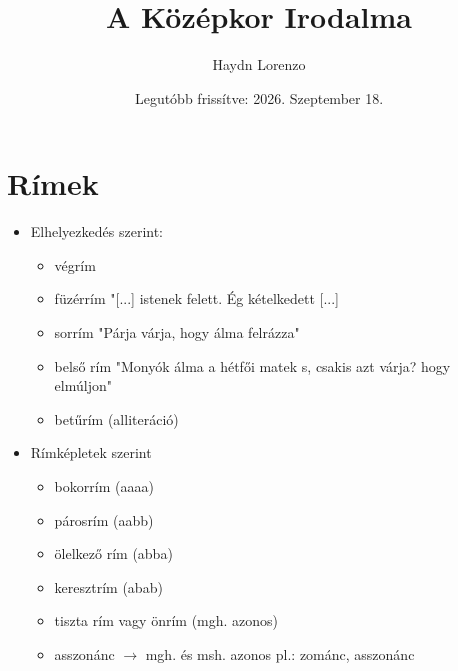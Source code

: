 \documentclass{article}
\title{A Középkor Irodalma}
\author{Haydn Lorenzo}
\date{Legutóbb frissítve: 2026. Szeptember 18.}
\begin{document}
\maketitle
\tableofcontents
\newpage

\section{Rímek}
\begin{itemize}
    \item Elhelyezkedés szerint:
    \begin{itemize}
        \item végrím
        \item füzérrím "[...] istenek felett. Ég kételkedett [...]
        \item sorrím "Párja várja, hogy álma felrázza"
        \item belső rím "Monyók álma a hétfői matek s, csakis azt várja? hogy elmúljon"
        \item betűrím (alliteráció)
    \end{itemize}
    \item Rímképletek szerint
    \begin{itemize}
        \item bokorrím (aaaa)
        \item párosrím (aabb)
        \item ölelkező rím (abba)
        \item keresztrím (abab)
        \item tiszta rím vagy önrím (mgh. azonos)
        \item asszonánc $\rightarrow$ mgh. és msh. azonos pl.: zománc, asszonánc
    \end{itemize}
\end{itemize}
\end{document}
